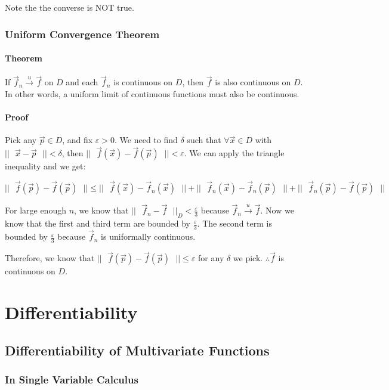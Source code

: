 \documentclass [12 pt, twoside] {book}
\newcommand\+{\text{ }}
\newcommand{\uconv}{\overset{u}{\to}}
\begin{document}
Note the the converse is NOT true.

\subsection{Uniform Convergence Theorem}
\subsubsection{Theorem}

If $\vec{f}_n \uconv \vec{f}$ on $D$ and each $\vec{f}_n$ is continuous on $D$,
then $\vec{f}$ is also continuous on $D$. In other words, a uniform limit of
continuous functions must also be continuous.

\subsubsection{Proof}

Pick any $\vec{p} \in D$, and fix $\varepsilon > 0$. We need to find $\delta$
such that $\forall \vec{x} \in D$ with $||\+\vec{x} - \vec{p}\+|| < \delta$,
then $||\+\vec{f}(\vec{x}) - \vec{f}(\vec{p})\+|| < \varepsilon$. 
We can apply the triangle inequality and we get:

$$||\+\vec{f}(\vec{p}) - \vec{f}(\vec{p})\+|| \leq ||\+\vec{f}(\vec{x}) -
\vec{f}_n(\vec{x})\+|| + ||\+\vec{f}_n(\vec{x}) - \vec{f}_n(\vec{p})\+|| +
||\+\vec{f}_n(\vec{p}) - \vec{f}(\vec{p})\+||$$

For large enough $n$, we know that $||\+\vec{f}_n - \vec{f}\+||_D < \frac{\varepsilon}{3}$
because $\vec{f}_n \uconv \vec{f}$. Now we know that the first and third term
are bounded by $\frac{\varepsilon}{3}$. The second term is bounded by
$\frac{\varepsilon}{3}$ because $\vec{f}_n$ is uniformally continuous.

Therefore, we know that $||\+\vec{f}(\vec{p}) - \vec{f}(\vec{p})\+|| \leq
\varepsilon$ for any $\delta$ we pick. $\therefore \vec{f}$ is continuous on
$D$.
\chapter{Differentiability}
\section{Differentiability of Multivariate Functions}
\subsection{In Single Variable Calculus}
\end{document}
